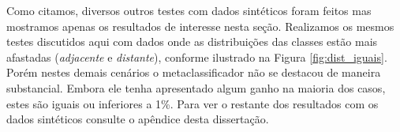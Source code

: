Como citamos, diversos outros testes com dados sintéticos foram feitos mas mostramos apenas os resultados de interesse nesta seção.
Realizamos os mesmos testes discutidos aqui com dados onde as distribuições das classes estão mais afastadas (\textit{adjacente} e \textit{distante}), conforme ilustrado na Figura \ref{fig:dist_iguais}.
Porém nestes demais cenários o metaclassificador não se destacou de maneira substancial.
Embora ele tenha apresentado algum ganho na maioria dos casos, estes são iguais ou inferiores a 1\%.
Para ver o restante dos resultados com os dados sintéticos consulte o apêndice desta dissertação.
